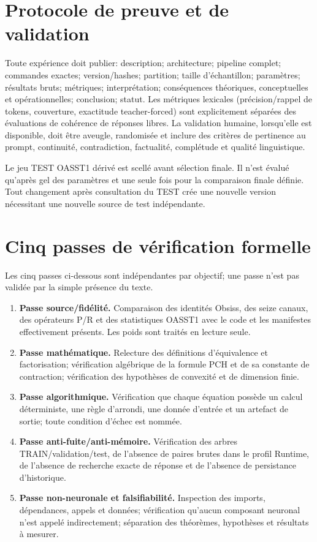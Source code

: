 \documentclass[11pt,a4paper]{report}
\begin{document}
\chapter{Protocole de preuve et de validation}
Toute expérience doit publier: description; architecture; pipeline complet; commandes exactes; version/hashes; partition; taille d'échantillon; paramètres; résultats bruts; métriques; interprétation; conséquences théoriques, conceptuelles et opérationnelles; conclusion; statut. Les métriques lexicales (précision/rappel de tokens, couverture, exactitude teacher-forced) sont explicitement séparées des évaluations de cohérence de réponses libres. La validation humaine, lorsqu'elle est disponible, doit être aveugle, randomisée et inclure des critères de pertinence au prompt, continuité, contradiction, factualité, complétude et qualité linguistique.

Le jeu TEST OASST1 dérivé est scellé avant sélection finale. Il n'est évalué qu'après gel des paramètres et une seule fois pour la comparaison finale définie. Tout changement après consultation du TEST crée une nouvelle version nécessitant une nouvelle source de test indépendante.

\chapter{Cinq passes de vérification formelle}
Les cinq passes ci-dessous sont indépendantes par objectif; une passe n'est pas validée par la simple présence du texte.
\begin{enumerate}
\item \textbf{Passe source/fidélité.} Comparaison des identités Obsiss, des seize canaux, des opérateurs P/R et des statistiques OASST1 avec le code et les manifestes effectivement présents. Les poids sont traités en lecture seule.
\item \textbf{Passe mathématique.} Relecture des définitions d'équivalence et factorisation; vérification algébrique de la formule PCH et de sa constante de contraction; vérification des hypothèses de convexité et de dimension finie.
\item \textbf{Passe algorithmique.} Vérification que chaque équation possède un calcul déterministe, une règle d'arrondi, une donnée d'entrée et un artefact de sortie; toute condition d'échec est nommée.
\item \textbf{Passe anti-fuite/anti-mémoire.} Vérification des arbres TRAIN/validation/test, de l'absence de paires brutes dans le profil Runtime, de l'absence de recherche exacte de réponse et de l'absence de persistance d'historique.
\item \textbf{Passe non-neuronale et falsifiabilité.} Inspection des imports, dépendances, appels et données; vérification qu'aucun composant neuronal n'est appelé indirectement; séparation des théorèmes, hypothèses et résultats à mesurer.
\end{enumerate}
\end{document}
